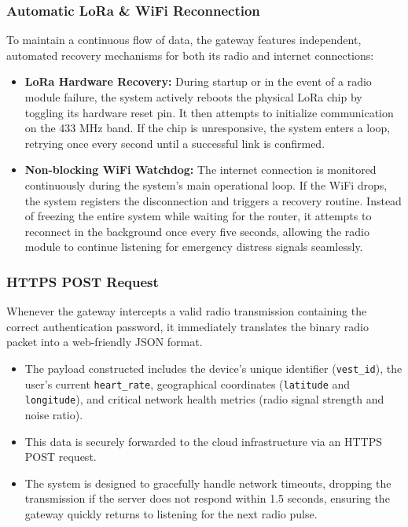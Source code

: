 \documentclass{article}
\begin{document}
\subsubsection{Automatic LoRa \& WiFi Reconnection}
To maintain a continuous flow of data, the gateway features independent, automated recovery mechanisms for both its radio and internet connections:
\begin{itemize}
\item \textbf{LoRa Hardware Recovery:} During startup or in the event of a radio module failure, the system actively reboots the physical LoRa chip by toggling its hardware reset pin. It then attempts to initialize communication on the 433 MHz band. If the chip is unresponsive, the system enters a loop, retrying once every second until a successful link is confirmed.
\item \textbf{Non-blocking WiFi Watchdog:} The internet connection is monitored continuously during the system's main operational loop. If the WiFi drops, the system registers the disconnection and triggers a recovery routine. Instead of freezing the entire system while waiting for the router, it attempts to reconnect in the background once every five seconds, allowing the radio module to continue listening for emergency distress signals seamlessly.
\end{itemize}

\subsubsection{HTTPS POST Request}
Whenever the gateway intercepts a valid radio transmission containing the correct authentication password, it immediately translates the binary radio packet into a web-friendly JSON format.
\begin{itemize}
\item The payload constructed includes the device's unique identifier (\verb|vest_id|), the user's current \verb|heart_rate|, geographical coordinates (\verb|latitude| and \verb|longitude|), and critical network health metrics (radio signal strength and noise ratio).
\item This data is securely forwarded to the cloud infrastructure via an HTTPS POST request.
\item The system is designed to gracefully handle network timeouts, dropping the transmission if the server does not respond within 1.5 seconds, ensuring the gateway quickly returns to listening for the next radio pulse.
\end{itemize}
\end{document}
